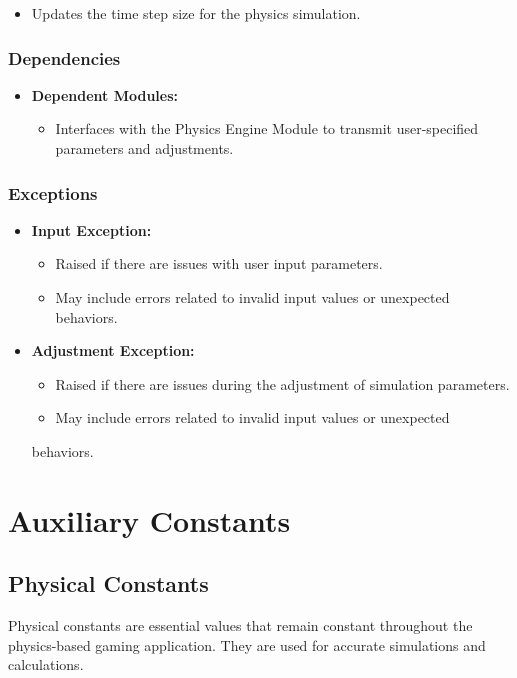 \documentclass[12pt, titlepage]{article}
\begin{document}
\begin{itemize}
  \item Updates the time step size for the physics simulation.
\end{itemize}

\subsubsection{Dependencies}
\begin{itemize}
  \item \textbf{Dependent Modules:}
    \begin{itemize}
        \item Interfaces with the Physics Engine Module to transmit user-specified parameters and adjustments.
    \end{itemize}
\end{itemize}

\subsubsection{Exceptions}
\begin{itemize}
  \item \textbf{Input Exception:}
    \begin{itemize}
     \item Raised if there are issues with user input parameters.
     \item May include errors related to invalid input values or unexpected behaviors.
    \end{itemize}
  \item \textbf{Adjustment Exception:}
    \begin{itemize}
        \item Raised if there are issues during the adjustment of simulation parameters.
        \item May include errors related to invalid input values or unexpected
   \end{itemize}behaviors.
\end{itemize}

\section{Auxiliary Constants}
\subsection{Physical Constants}
Physical constants are essential values that remain constant throughout the physics-based gaming application. They are used for accurate simulations and calculations.
\end{document}
